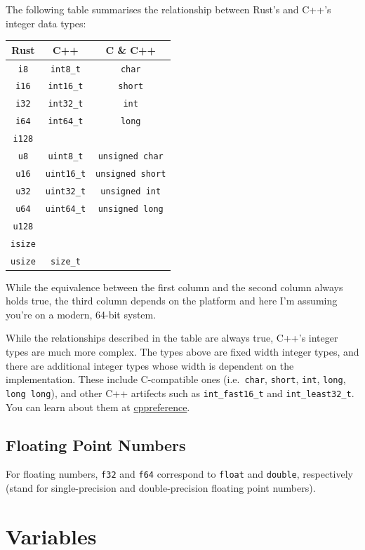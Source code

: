 \documentclass[
]{book}
\begin{document}
The following table summarises the relationship between Rust's and C++'s integer data types:

\begin{longtable}[]{@{}ccc@{}}
\toprule
Rust & C++ & C \& C++\tabularnewline
\midrule
\endhead
\texttt{i8} & \texttt{int8\_t} & \texttt{char}\tabularnewline
\texttt{i16} & \texttt{int16\_t} & \texttt{short}\tabularnewline
\texttt{i32} & \texttt{int32\_t} & \texttt{int}\tabularnewline
\texttt{i64} & \texttt{int64\_t} & \texttt{long}\tabularnewline
\texttt{i128} & &\tabularnewline
\texttt{u8} & \texttt{uint8\_t} & \texttt{unsigned\ char}\tabularnewline
\texttt{u16} & \texttt{uint16\_t} & \texttt{unsigned\ short}\tabularnewline
\texttt{u32} & \texttt{uint32\_t} & \texttt{unsigned\ int}\tabularnewline
\texttt{u64} & \texttt{uint64\_t} & \texttt{unsigned\ long}\tabularnewline
\texttt{u128} & &\tabularnewline
\texttt{isize} & &\tabularnewline
\texttt{usize} & \texttt{size\_t} &\tabularnewline
\bottomrule
\end{longtable}

While the equivalence between the first column and the second column always holds true, the third column depends on the platform and here I'm assuming you're on a modern, 64-bit system.

While the relationships described in the table are always true, C++'s integer types are much more complex. The types above are fixed width integer types, and there are additional integer types whose width is dependent on the implementation. These include C-compatible ones (i.e.~\texttt{char}, \texttt{short}, \texttt{int}, \texttt{long}, \texttt{long\ long}), and other C++ artifects such as \texttt{int\_fast16\_t} and \texttt{int\_least32\_t}. You can learn about them at \href{https://en.cppreference.com/w/cpp/types/integer}{cppreference}.

\hypertarget{floating-point-numbers}{%
\subsection{Floating Point Numbers}\label{floating-point-numbers}}

For floating numbers, \texttt{f32} and \texttt{f64} correspond to \texttt{float} and \texttt{double}, respectively (stand for single-precision and double-precision floating point numbers).

\hypertarget{variables}{%
\section{Variables}\label{variables}}
\end{document}
